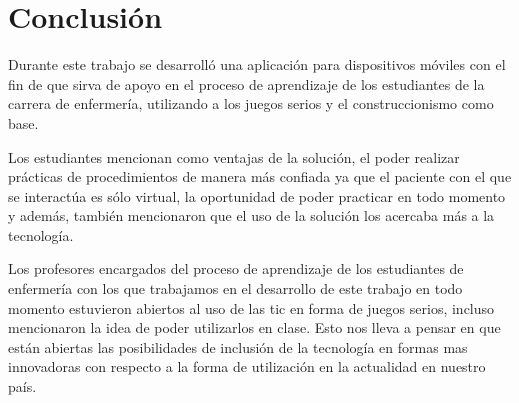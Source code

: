 \chapter{Conclusión}
\label{chap:conclusion}


Durante este trabajo  se desarrolló una
aplicación para dispositivos móviles con el fin de que sirva de apoyo en el
proceso de aprendizaje de los estudiantes de la carrera de enfermería,
utilizando a los juegos serios y el construccionismo como base.


Los estudiantes mencionan como ventajas de la solución, el poder realizar
prácticas de procedimientos de manera más confiada ya que el paciente con el que
se interactúa es sólo virtual, la oportunidad de poder practicar en todo momento
y además, también mencionaron que el uso de la solución los acercaba más a la
tecnología.

Los profesores encargados del proceso de aprendizaje de los estudiantes de
enfermería con los que trabajamos en el desarrollo de este trabajo en todo
momento estuvieron abiertos al uso de las \Gls{tic} en forma de juegos serios,
incluso mencionaron la idea de poder utilizarlos en clase. Esto nos lleva a
pensar en que están abiertas las posibilidades de inclusión de la tecnología en
formas mas innovadoras con respecto a la forma de utilización en la actualidad
en nuestro país.

